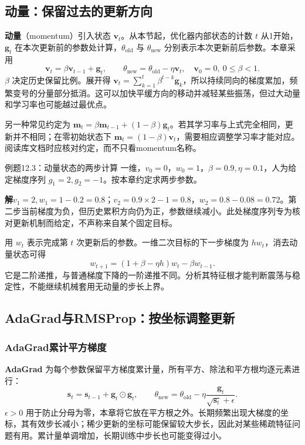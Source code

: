 \documentclass[UTF8,fontset=none,zihao=-4,a4paper]{ctexart}
\newcommand{\term}[1]{\textbf{#1}}
\newcommand{\sol}{\par\noindent\textbf{解}\quad}
\numberwithin{equation}{section}
\numberwithin{figure}{section}
\begin{document}
\subsection{动量：保留过去的更新方向}
\term{动量}（momentum）引入状态 $\symbf v_t$。从本节起，优化器内部状态的计数 $t$ 从1开始，$\symbf g_t$ 在本次更新前的参数处计算，$\theta_{\mathrm{old}}$ 与 $\theta_{\mathrm{new}}$ 分别表示本次更新前后参数。本章采用
\begin{equation}
 \symbf v_t=\beta\symbf v_{t-1}+\symbf g_t,
 \qquad\theta_{\mathrm{new}}=\theta_{\mathrm{old}}-\eta\symbf v_t,
 \quad \symbf v_0=0,\ 0\leq\beta<1.
\end{equation}
$\beta$ 决定历史保留比例。展开得 $\symbf v_t=\sum_{k=1}^t\beta^{t-k}\symbf g_k$，所以持续同向的梯度累加，频繁变号的分量部分抵消。这可以加快平缓方向的移动并减轻某些振荡，但过大动量和学习率也可能越过最优点。

另一种常见约定为 $\symbf m_t=\beta\symbf m_{t-1}+(1-\beta)\symbf g_t$。若其学习率与上式完全相同，更新并不相同；在零初始状态下 $\symbf m_t=(1-\beta)\symbf v_t$，需要相应调整学习率才能对应。阅读库文档时应核对约定，而不只看momentum名称。

\begin{infobox}{例题12.3：动量状态的两步计算}
一维，$v_0=0$，$w_0=1$，$\beta=0.9,\eta=0.1$，人为给定梯度序列 $g_1=2,g_2=-1$。按本章约定求两步参数。
\end{infobox}
\sol $v_1=2,w_1=1-0.2=0.8$；$v_2=0.9\times2-1=0.8$，$w_2=0.8-0.08=0.72$。第二步当前梯度为负，但历史累积方向仍为正，参数继续减小。此处梯度序列专为核对更新机制而给定，不声称来自某个固定目标。

用 $w_t$ 表示完成第 $t$ 次更新后的参数。一维二次目标的下一步梯度为 $hw_t$，消去动量状态可得
\[
 w_{t+1}=(1+\beta-\eta h)w_t-\beta w_{t-1}.
\]
它是二阶递推，与普通梯度下降的一阶递推不同。分析其特征根才能判断震荡与稳定性，不能继续机械套用无动量的步长上界。

\subsection{AdaGrad与RMSProp：按坐标调整更新}
\subsubsection{AdaGrad累计平方梯度}
\term{AdaGrad} 为每个参数保留平方梯度累计量，所有平方、除法和平方根均逐元素进行：
\begin{equation}
 \symbf s_t=\symbf s_{t-1}+\symbf g_t\odot\symbf g_t,
 \qquad\theta_{\mathrm{new}}=\theta_{\mathrm{old}}-\eta\frac{\symbf g_t}{\sqrt{\symbf s_t}+\epsilon}.
\end{equation}
$\epsilon>0$ 用于防止分母为零，本章将它放在平方根之外。长期频繁出现大梯度的坐标，其有效步长减小；稀少更新的坐标可能保留较大步长，因此对某些稀疏特征问题有用。累计量单调增加，长期训练中步长也可能变得过小。
\end{document}
